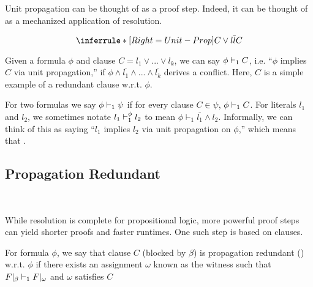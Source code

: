 Unit propagation can be thought of as a proof step. Indeed, it can be thought of as a mechanized application of resolution.

\begin{equation*}
    \inferrule*[Right=Unit-Prop]{
        C \lor l \\ \overline{l}
    }{
        C
    }
\end{equation*}

Given a formula $\phi$ and clause $C = l_1 \lor ... \lor l_k$, we can say $\phi \vdash_1 C$, i.e. ``$\phi$ implies $C$ via unit propagation,'' if $\phi \land \overline{l_1} \land ... \land \overline{l_k}$ derives a conflict. Here, $C$ is a simple example of a redundant clause w.r.t. $\phi$. 








For two formulas we say $\phi \vdash_1 \psi$ if for every clause $C \in \psi$, $\phi \vdash_1 C$. For literals $l_1$ and $l_2$, we sometimes notate $l_1 \vdash_1^\phi l_2$ to mean $\phi \vdash_1 \overline{l_1} \land l_2$. Informally, we can think of this as saying ``$l_1$ implies $l_2$ via unit propagation on $\phi$,'' which means that .


\subsection{Propagation Redundant}~\label{subsec:pr}

While resolution is complete for propositional logic, more powerful proof steps can yield shorter proofs and faster runtimes. One such step is based on \pr clauses.

\begin{definition}
    For formula $\phi$, we say that clause $C$ (blocked by $\beta$) is propagation redundant (\pr) w.r.t. $\phi$ if there exists an assignment $\omega$ known as the witness such that $F|_\beta \vdash_1 F|_\omega$ and $\omega$ satisfies $C$
\end{definition}

